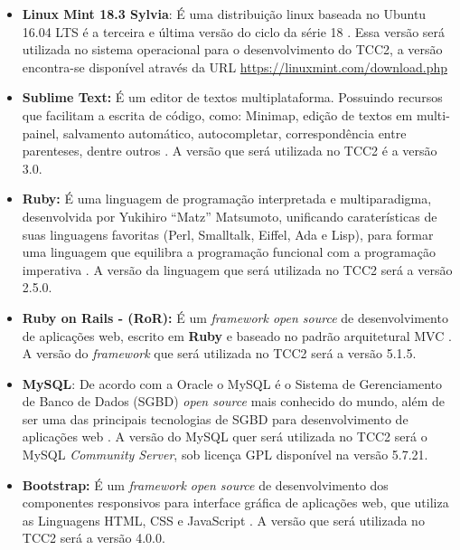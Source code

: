 \begin{itemize}
	
	\item \textbf{Linux Mint 18.3 Sylvia}: É uma distribuição linux baseada no Ubuntu 16.04 LTS é a terceira e última versão do ciclo da série 18 \cite{Mint}. Essa versão será utilizada no sistema operacional para o desenvolvimento do TCC2, a versão encontra-se disponível através da URL \url{https://linuxmint.com/download.php} 
	
	\item \textbf{Sublime Text:} É um editor de textos multiplataforma. Possuindo recursos que facilitam a escrita de código, como: Minimap, edição de textos em multi-painel, salvamento automático, autocompletar, correspondência entre parenteses, dentre outros \cite{SublimeText}. A versão que será utilizada no TCC2 é a versão 3.0.
	
	\item \textbf{Ruby:} É uma linguagem de programação interpretada e multiparadigma, desenvolvida por Yukihiro “Matz” Matsumoto, unificando caraterísticas de suas linguagens favoritas (Perl, Smalltalk, Eiffel, Ada e Lisp), para formar uma linguagem que equilibra a programação funcional com a programação imperativa \cite{Ruby}. A versão da linguagem que será utilizada no TCC2 será a versão 2.5.0.
	
	\item \textbf{Ruby on Rails - (RoR):} É um  \textit{framework open source} de desenvolvimento de aplicações web, escrito em \textbf{Ruby} e baseado no padrão arquitetural MVC \cite{RoR}. A versão do \textit{framework} que será utilizada no TCC2 será a versão 5.1.5.
	
	\item \textbf{MySQL}: De acordo com a Oracle o MySQL é o Sistema de Gerenciamento de Banco de Dados (SGBD) \textit{open source} mais conhecido do mundo, além de ser uma das principais tecnologias de SGBD para desenvolvimento de aplicações web \cite{MySQL}. A versão do MySQL quer será utilizada no TCC2 será o MySQL \textit{Community Server}, sob licença GPL disponível na versão 5.7.21.
	
	\item \textbf{Bootstrap:} É um \textit{framework open source} de desenvolvimento dos componentes responsivos para interface gráfica de aplicações web, que utiliza as Linguagens HTML, CSS e JavaScript \cite{Bootstrap}. A versão que será utilizada no TCC2 será a versão 4.0.0. 
	
\end{itemize}

